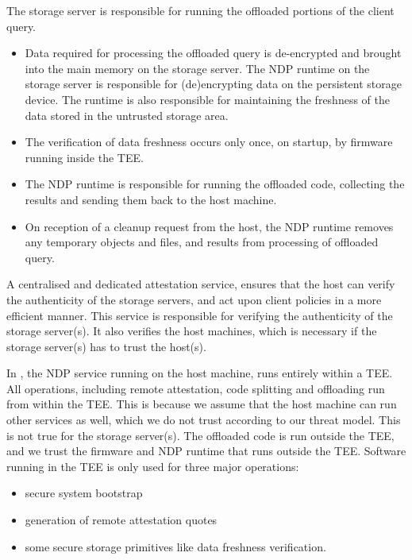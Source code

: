 The storage server is responsible for running the offloaded portions of the client query. 
\begin{itemize}
        \item Data required for processing the offloaded query is de-encrypted and brought into the main memory on the storage server. The NDP runtime on the storage server is responsible for (de)encrypting data on the persistent storage device. The runtime is also responsible for maintaining the freshness of the data stored in the untrusted storage area.
        \item The verification of data freshness occurs only once, on startup, by firmware running inside the TEE.
    \item The NDP runtime is responsible for running the offloaded code, collecting the results and sending them back to the host machine.
    \item On reception of a cleanup request from the host, the NDP runtime removes any temporary objects and files, and results from processing of offloaded query.
\end{itemize}

A centralised and dedicated attestation service, ensures that the host can verify the authenticity of the storage servers, and act upon client policies in a more efficient manner. This service is responsible for verifying the authenticity of the storage server(s). It also verifies the host machines, which is necessary if the storage server(s) has to trust the host(s).

In \project{}, the NDP service running on the host machine, runs entirely within a TEE. All operations, including remote attestation, code splitting and offloading run from within the TEE. This is because we assume that the host machine can run other services as well, which we do not trust according to our threat model. This is not true for the storage server(s). The offloaded code is run outside the TEE, and we trust the firmware and NDP runtime that runs outside the TEE. Software running in the TEE is only used for three major operations:
\begin{itemize}
    \item secure system bootstrap
    \item generation of remote attestation quotes
    \item some secure storage primitives like data freshness verification.
\end{itemize}


